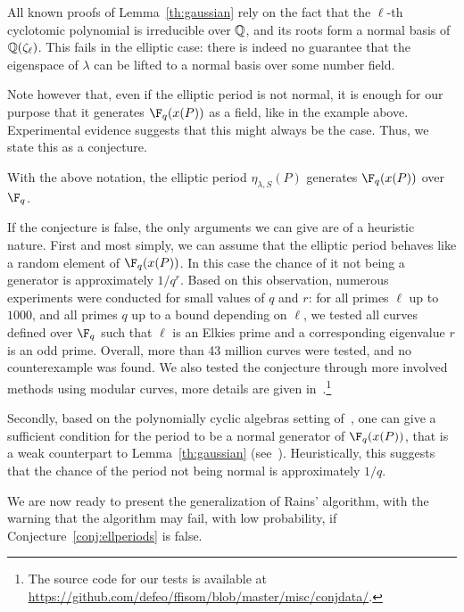 All known proofs of Lemma~\ref{th:gaussian} rely on the fact that
the $\ell$-th cyclotomic polynomial is irreducible over $\mathbb{Q}$, and its
roots form a normal basis of $\mathbb{Q}(\zeta_\ell)$. %
This fails in the elliptic case: there is indeed no guarantee that the
eigenspace of $\lambda$ can be lifted to a normal basis over some
number field.

Note however that, even if the elliptic period is not normal, it is
enough for our purpose that it generates $\F_q(x(P))$ as a field, like
in the example above.
Experimental evidence suggests that this might always be the
case.
Thus, we state this as a conjecture.

\begin{conjecture}
\label{conj:ellperiods}
With the above notation, the elliptic period $\eta_{\lambda,S}(P)$
generates $\F_q(x(P))$ over $\F_q$.
\end{conjecture}

If the conjecture is false, the only arguments we can give are of a
heuristic nature.  First and most simply, we can assume that the
elliptic period behaves like a random element of $\F_q(x(P))$. In this
case the chance of it not being a generator is approximately
$1/q^r$. %
Based on this observation, numerous experiments were conducted for
small values of $q$ and $r$: for all primes $\ell$ up to $1000$,
and all primes $q$ up to a bound depending on $\ell$,
we tested all curves defined over $\F_q$ such that $\ell$
is an Elkies prime and a corresponding eigenvalue $r$
is an odd prime. %
Overall, more than 43 million curves were tested, and no
counterexample was found. %
We also tested the conjecture through more involved methods using
modular curves, more details are given
in~\cite[Appendix~C.2]{ffisom-long}.\footnote{The source code for our
  tests is available at
  \url{https://github.com/defeo/ffisom/blob/master/misc/conjdata/}.} %

Secondly, based on the polynomially cyclic algebras setting
of~\cite{Mihailescu2010825}, one can give a sufficient
condition for the period to be a normal generator of
$\F_q(x(P))$, that is a weak counterpart to Lemma~\ref{th:gaussian}
(see~\cite[Appendix~C.1]{ffisom-long}). %
Heuristically, this suggests that the
chance of the period not being normal is approximately $1/q$.

We are now ready to present the generalization of Rains' algorithm,
with the warning that the algorithm may fail, with low probability, if
Conjecture~\ref{conj:ellperiods} is false.



